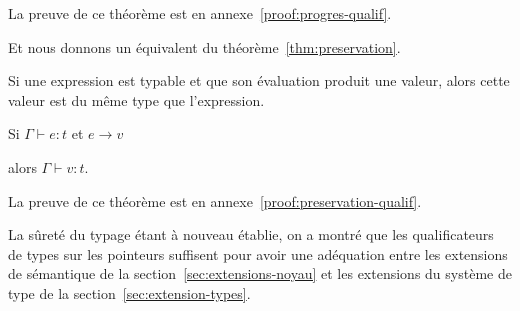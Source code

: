 La preuve de ce théorème est en annexe~\ref{proof:progres-qualif}.

Et nous donnons un équivalent du théorème~\ref{thm:preservation}.

\begin{theorem}
  \label{thm:preservation-qualif}

  Si une expression est typable et que son évaluation produit une valeur, alors
  cette valeur est du même type que l'expression.

  Si $Γ ⊢ e : t$ et $e → v$ %

  alors $Γ ⊢ v : t$.

\end{theorem}

La preuve de ce théorème est en annexe~\ref{proof:preservation-qualif}.

La sûreté du typage étant à nouveau établie, on a montré que les qualificateurs
de types sur les pointeurs suffisent pour avoir une adéquation entre les
extensions de sémantique de la section~\ref{sec:extensions-noyau} et les
extensions du système de type de la section~\ref{sec:extension-types}.

